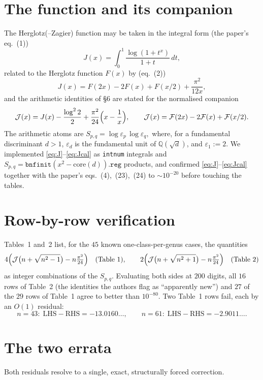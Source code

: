 \documentclass[11pt]{article}
\newcommand{\eps}{\varepsilon}
\newcommand{\Jcal}{\mathcal{J}}
\theoremstyle{plain}\newtheorem{theorem}{Theorem}\newtheorem{proposition}[theorem]{Proposition}
\theoremstyle{remark}\newtheorem{remark}[theorem]{Remark}
\begin{document}
\section{The function and its companion}
The Herglotz(--Zagier) function may be taken in the integral form (the paper's eq.~(1))
\begin{equation}\label{eq:J}
  J(x)=\int_0^1\frac{\log(1+t^{x})}{1+t}\,dt ,
\end{equation}
related to the Herglotz function $F(x)$ by (eq.~(2))
\begin{equation}\label{eq:JF}
  J(x)=F(2x)-2F(x)+F(x/2)+\frac{\pi^2}{12x},
\end{equation}
and the arithmetic identities of \S6 are stated for the normalised companion
\begin{equation}\label{eq:Jcal}
  \Jcal(x)=J(x)-\frac{\log^2 2}{2}+\frac{\pi^2}{24}\Bigl(x-\frac1x\Bigr),
  \qquad \Jcal(x)=\mathcal F(2x)-2\mathcal F(x)+\mathcal F(x/2).
\end{equation}
The arithmetic atoms are
\(
  S_{p,q}=\log\eps_p\,\log\eps_q,
\)
where, for a fundamental discriminant $d>1$, $\eps_d$ is the fundamental unit of $\mathbb Q(\sqrt d)$, and
$\eps_1:=2$. We implemented \eqref{eq:J}--\eqref{eq:Jcal} as \texttt{intnum} integrals and
$S_{p,q}=\texttt{bnfinit}(x^2-\mathrm{core}(d)).\texttt{reg}$ products, and confirmed
\eqref{eq:J}--\eqref{eq:Jcal} together with the paper's eqs.~(4),~(23),~(24) to $\sim10^{-20}$ before
touching the tables.

\section{Row-by-row verification}
Tables~1 and~2 list, for the $45$ known one-class-per-genus cases, the quantities
\[
  4\Bigl(\Jcal\bigl(n+\sqrt{n^2-1}\bigr)-n\tfrac{\pi^2}{24}\Bigr)\quad(\text{Table 1}),\qquad
  2\Bigl(\Jcal\bigl(n+\sqrt{n^2+1}\bigr)-n\tfrac{\pi^2}{24}\Bigr)\quad(\text{Table 2})
\]
as integer combinations of the $S_{p,q}$. Evaluating both sides at $200$ digits, all $16$ rows of Table~2
(the identities the authors flag as ``apparently new'') and $27$ of the $29$ rows of Table~1 agree to
better than $10^{-80}$. Two Table~1 rows fail, each by an $O(1)$ residual:
\[
  \text{$n=43$:}\ \ \text{LHS}-\text{RHS}=-13.0160\ldots,\qquad
  \text{$n=61$:}\ \ \text{LHS}-\text{RHS}=-2.9011\ldots .
\]

\section{The two errata}
Both residuals resolve to a single, exact, structurally forced correction.
\end{document}
